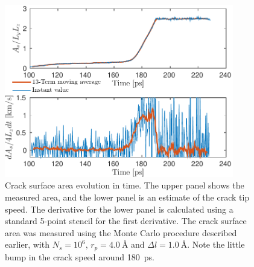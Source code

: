 \begin{figure}
\centering
\includegraphics[width=10cm]{../figures/thesis/crack_area_evolution_1048.pdf}
\caption{Crack surface area evolution in time. The upper panel shows the measured area, and the lower panel is an estimate of the crack tip speed. The derivative for the lower panel is calculated using a standard 5-point stencil for the first derivative. The crack surface area was measured using the Monte Carlo procedure described earlier, with $N_s = 10^6$, $r_p = \SI{4.0}{\angstrom}$ and $\Delta l = \SI{1.0}{\angstrom}$. Note the little bump in the crack speed around \SI{180}{\pico\second}.}
\label{fig:crack_area_evolution_1048}
\end{figure}

